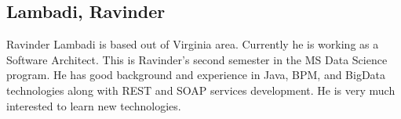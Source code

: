 
\subsection{Lambadi, Ravinder}

Ravinder Lambadi is based out of Virginia area. Currently he is working as a Software Architect. 
This is Ravinder's second semester in the MS Data Science program. He has good background and experience in Java, BPM, and BigData technologies along with REST and SOAP services development. He is very much interested to learn new technologies.
